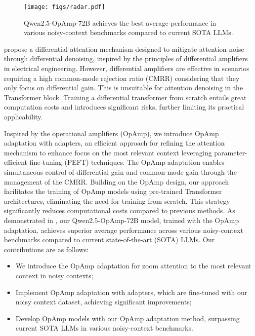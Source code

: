 \begin{figure}[tb!]
    \centering
    \texttt{[image: figs/radar.pdf]} 
    \caption{Qwen2.5-OpAmp-72B achieves the best average performance in various noisy-context benchmarks compared to current SOTA LLMs.}
    \label{fig:radar}
\end{figure}

\citet{ye2025difftrans} propose a differential attention mechanism designed to mitigate attention noise through differential denoising, inspired by the principles of differential amplifiers in electrical engineering. 
However, differential amplifiers are effective in scenarios requiring a high common-mode rejection ratio (CMRR) considering that they only focus on differential gain. 
This is unsuitable for attention denoising in the Transformer block.
Training a differential transformer from scratch entails great computation costs and introduces significant risks, further limiting its practical applicability.

Inspired by the operational amplifiers (OpAmp), we introduce OpAmp adaptation with adapters, an efficient approach for refining the attention mechanism to enhance focus on the most relevant context leveraging parameter-efficient fine-tuning (PEFT) techniques. 
The OpAmp adaptation enables simultaneous control of differential gain and common-mode gain through the management of the CMRR. 
Building on the OpAmp design, our approach facilitates the training of OpAmp models using pre-trained Transformer architectures, eliminating the need for training from scratch. 
This strategy significantly reduces computational costs compared to previous methods. 
As demonstrated in , our Qwen2.5-OpAmp-72B model, trained with the OpAmp adaptation, achieves superior average performance across various noisy-context benchmarks compared to current state-of-the-art (SOTA) LLMs. 
Our contributions are as follows:
\begin{itemize}[itemsep=0pt,topsep=0pt,parsep=0pt]
    \item We introduce the OpAmp adaptation for zoom attention to the most relevant context in noisy contexts;
    \item Implement OpAmp adaptation with adapters, which are fine-tuned with our noisy context dataset, achieving significant improvements;
    \item Develop OpAmp models with our OpAmp adaptation method, surpassing current SOTA LLMs in various noisy-context benchmarks.
\end{itemize}